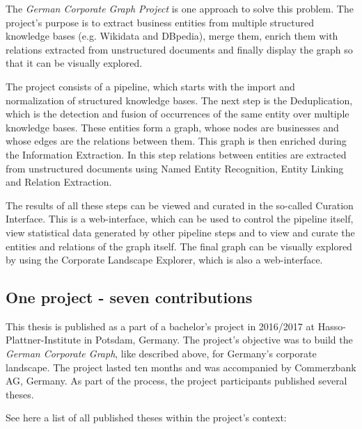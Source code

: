 The \emph{German Corporate Graph Project} is one approach to solve this problem. The project's purpose is to extract business entities from multiple structured knowledge bases (e.g. Wikidata and DBpedia), merge them, enrich them with relations extracted from unstructured documents and finally display the graph so that it can be visually explored.\par

The project consists of a pipeline, which starts with the import and normalization of structured knowledge bases. The next step is the Deduplication, which is the detection and fusion of occurrences of the same entity over multiple knowledge bases. These entities form a graph, whose nodes are businesses and whose edges are the relations between them. This graph is then enriched during the Information Extraction. In this step relations between entities are extracted from unstructured documents using Named Entity Recognition, Entity Linking and Relation Extraction. 

The results of all these steps can be viewed and curated in the so-called Curation Interface. This is a web-interface, which can be used to control the pipeline itself, view statistical data generated by other pipeline steps and to view and curate the entities and relations of the graph itself. The final graph can be visually explored by using the Corporate Landscape Explorer, which is also a web-interface.



\subsection{One project - seven contributions}
This thesis is published as a part of a bachelor's project in 2016/2017 at Hasso-Plattner-Institute in Potsdam, Germany. The project's objective was to build the \emph {German Corporate Graph}, like described above, for Germany's corporate landscape. The project lasted ten months and was accompanied by Commerzbank AG, Germany. As part of the process, the project participants published several theses. 

See here a list of all published theses within the project's context:

